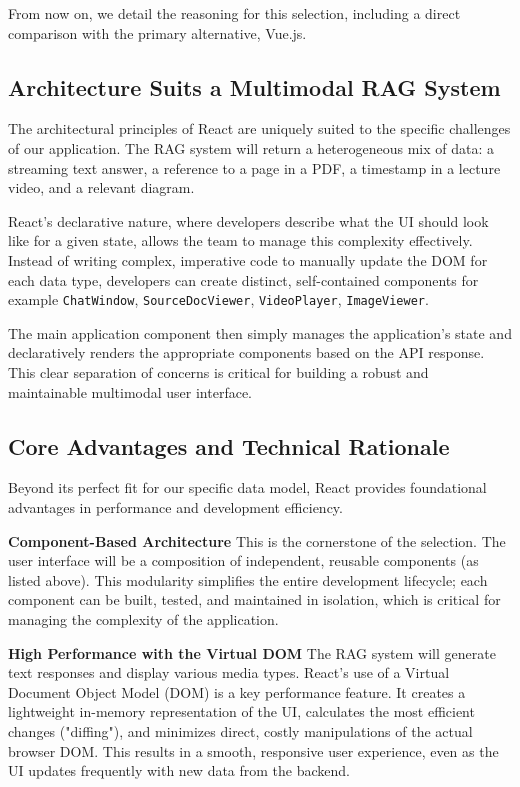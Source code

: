 From now on, we detail the reasoning for this selection, including a direct comparison with the primary alternative, Vue.js.

\subsection{Architecture Suits a Multimodal RAG System}
The architectural principles of React are uniquely suited to the specific challenges of our application. The RAG system will return a heterogeneous mix of data: a streaming text answer, a reference to a page in a PDF, a timestamp in a lecture video, and a relevant diagram.

React's declarative nature, where developers describe what the UI should look like for a given state, allows the team to manage this complexity effectively. Instead of writing complex, imperative code to manually update the DOM for each data type, developers can create distinct, self-contained components for example \texttt{ChatWindow}, \texttt{SourceDocViewer}, \texttt{VideoPlayer}, \texttt{ImageViewer}. 

The main application component then simply manages the application's state and declaratively renders the appropriate components based on the API response. This clear separation of concerns is critical for building a robust and maintainable multimodal user interface.

\subsection{Core Advantages and Technical Rationale}
Beyond its perfect fit for our specific data model, React provides foundational advantages in performance and development efficiency.

\textbf{Component-Based Architecture}
This is the cornerstone of the selection. The user interface will be a composition of independent, reusable components (as listed above). This modularity simplifies the entire development lifecycle; each component can be built, tested, and maintained in isolation, which is critical for managing the complexity of the application.

\textbf{High Performance with the Virtual DOM}
The RAG system will generate text responses and display various media types. React's use of a Virtual Document Object Model (DOM) is a key performance feature. It creates a lightweight in-memory representation of the UI, calculates the most efficient changes ("diffing"), and minimizes direct, costly manipulations of the actual browser DOM. This results in a smooth, responsive user experience, even as the UI updates frequently with new data from the backend.

